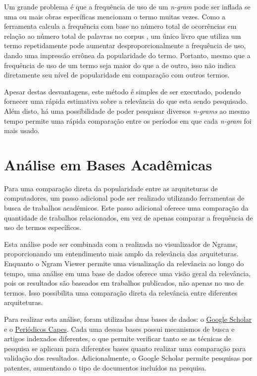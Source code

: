 \documentclass[
	article,			%
	11pt,				%
	oneside,			%
	a4paper,			%
	english,			%
	brazil,				%
	sumario=tradicional
	]{abntex2}
\begin{document}
Um grande problema é que a frequência de uso de um \textit{n-gram} pode ser inflada se uma ou mais obras específicas mencionam o termo muitas vezes. Como a ferramenta calcula a frequência com base no número total de ocorrências em relação ao número total de palavras no corpus \cite{michel_quantitative_2011}, um único livro que utiliza um termo repetidamente pode aumentar desproporcionalmente a frequência de uso, dando uma impressão errônea da popularidade do termo. Portanto, mesmo que a frequência de uso de um termo seja maior do que a de outro, isso não indica diretamente seu nível de popularidade em comparação com outros termos.

Apesar destas desvantagens, este método é simples de ser executado, podendo fornecer uma rápida estimativa sobre a relevância do que esta sendo pesquisado. Além disto, há uma possibilidade de poder pesquisar diversos \textit{n-grams} ao mesmo tempo permite uma rápida comparação entre os períodos em que cada \textit{n-gram} foi mais usado.

\section{Análise em Bases Acadêmicas}

Para uma comparação direta da popularidade entre as arquiteturas de computadores, um passo adicional pode ser realizado utilizando ferramentas de busca de trabalhos acadêmicos. Este passo adicional oferece uma comparação da quantidade de trabalhos relacionados, em vez de apenas comparar a frequência de uso de termos específicos.

Esta análise pode ser combinada com a realizada no visualizador de Ngrams, proporcionando um entendimento mais amplo da relevância das arquiteturas. Enquanto o Ngram Viewer permite uma visualização da relevância ao longo do tempo, uma análise em uma base de dados oferece uma visão geral da relevância, pois os resultados são baseados em trabalhos publicados, não apenas no uso de termos. Isso possibilita uma comparação direta da relevância entre diferentes arquiteturas.

Para realizar esta análise, foram utilizadas duas bases de dados: o \href{https://scholar.google.com/}{Google Scholar} e o \href{https://www.periodicos.capes.gov.br/}{Periódicos Capes}. Cada uma dessas bases possui mecanismos de busca e artigos indexados diferentes, o que permite verificar tanto se as técnicas de pesquisa se aplicam para diferentes bases quanto realizar uma comparação para validação dos resultados. Adicionalmente, o Google Scholar permite pesquisas por patentes, aumentando o tipo de documentos incluídos na pesquisa.
\end{document}
